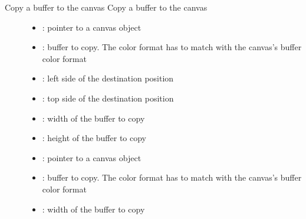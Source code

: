 \documentclass[letterpaper,10pt,english]{sphinxmanual}
\begin{document}
\begin{fulllineitems}
\label{\detokenize{object-types/canvas:_CPPv418lv_canvas_copy_bufP8lv_obj_tPKv10lv_coord_t10lv_coord_t10lv_coord_t10lv_coord_t}}%
\pysigstartmultiline
{}\label{\detokenize{object-types/canvas:lv__canvas_8h_1a5b23403e36dffc964c9a6225467106af}}%
\pysigstopmultiline
Copy a buffer to the canvas 
Copy a buffer to the canvas 
\begin{description}
\item[{}] \leavevmode\begin{itemize}
\item {} 
: pointer to a canvas object 

\item {} 
: buffer to copy. The color format has to match with the canvas’s buffer color format 

\item {} 
: left side of the destination position 

\item {} 
: top side of the destination position 

\item {} 
: width of the buffer to copy 

\item {} 
: height of the buffer to copy

\end{itemize}

\item[{}] \leavevmode\begin{itemize}
\item {} 
: pointer to a canvas object 

\item {} 
: buffer to copy. The color format has to match with the canvas’s buffer color format 

\item {} 
: width of the buffer to copy 


\end{itemize}
\end{description}
\end{fulllineitems}
\end{document}
